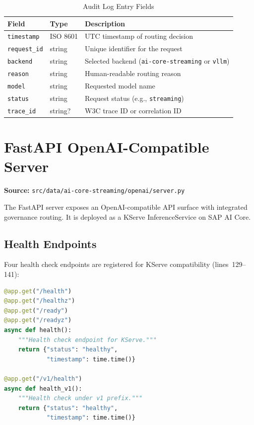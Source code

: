 \documentclass[11pt]{article}
\begin{document}
\begin{table}[h]
\centering
\caption{Audit Log Entry Fields}
\begin{tabular}{@{}lll@{}}
\toprule
\textbf{Field} & \textbf{Type} & \textbf{Description} \\
\midrule
\texttt{timestamp} & ISO 8601 & UTC timestamp of routing decision \\
\texttt{request\_id} & string & Unique identifier for the request \\
\texttt{backend} & string & Selected backend (\texttt{ai-core-streaming} or \texttt{vllm}) \\
\texttt{reason} & string & Human-readable routing reason \\
\texttt{model} & string & Requested model name \\
\texttt{status} & string & Request status (e.g., \texttt{streaming}) \\
\texttt{trace\_id} & string? & W3C trace ID or correlation ID \\
\bottomrule
\end{tabular}
\end{table}

\section{FastAPI OpenAI-Compatible Server}
\label{sec:server}

\noindent\textbf{Source:}
\texttt{src/data/ai-core-streaming/openai/server.py}

The FastAPI server exposes an OpenAI-compatible API surface with integrated
governance routing. It is deployed as a KServe InferenceService on SAP AI Core.

\subsection{Health Endpoints}

Four health check endpoints are registered for KServe compatibility
(lines~129--141):

\begin{lstlisting}[language=Python,caption={Health endpoints (server.py, lines 129--141)},firstnumber=129]
@app.get("/health")
@app.get("/healthz")
@app.get("/ready")
@app.get("/readyz")
async def health():
    """Health check endpoint for KServe."""
    return {"status": "healthy",
            "timestamp": time.time()}

@app.get("/v1/health")
async def health_v1():
    """Health check under v1 prefix."""
    return {"status": "healthy",
            "timestamp": time.time()}
\end{lstlisting}
\end{document}
